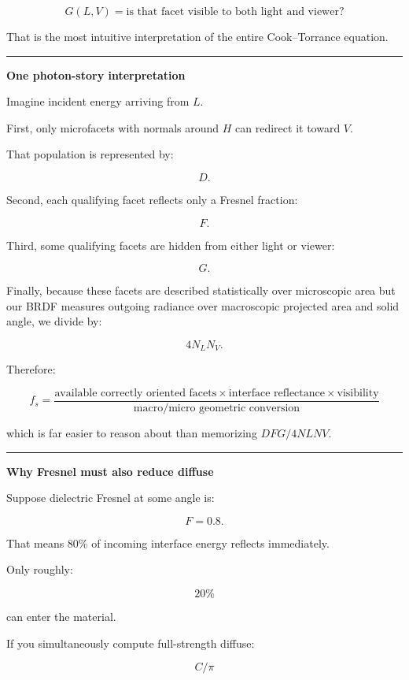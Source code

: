 \[
G(L,V)=
\text{is that facet visible to both light and viewer?}
\]

That is the most intuitive interpretation of the entire Cook--Torrance equation.

\begin{center}\rule{0.5\linewidth}{0.5pt}\end{center}

\textbf{One photon-story interpretation}

Imagine incident energy arriving from \(L\).

First, only microfacets with normals around \(H\) can redirect it toward \(V\).

That population is represented by:

\[
D.
\]

Second, each qualifying facet reflects only a Fresnel fraction:

\[
F.
\]

Third, some qualifying facets are hidden from either light or viewer:

\[
G.
\]

Finally, because these facets are described statistically over microscopic area but our BRDF measures outgoing radiance over macroscopic projected area and solid angle, we divide by:

\[
4N_LN_V.
\]

Therefore:

\[
\boxed{
f_s=
\frac{
\text{available correctly oriented facets}
\times
\text{interface reflectance}
\times
\text{visibility}
}{
\text{macro/micro geometric conversion}
}
}
\]

which is far easier to reason about than memorizing \(DFG/4NLNV\).

\begin{center}\rule{0.5\linewidth}{0.5pt}\end{center}

\textbf{Why Fresnel must also reduce diffuse}

Suppose dielectric Fresnel at some angle is:

\[
F=0.8.
\]

That means 80\% of incoming interface energy reflects immediately.

Only roughly:

\[
20\%
\]

can enter the material.

If you simultaneously compute full-strength diffuse:

\[
C/\pi
\]

